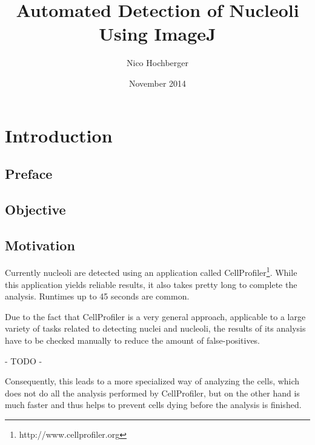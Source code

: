 \documentclass[a4paper, 12pt]{article}
\begin{document}

\nocite{*}

\title{Automated Detection of Nucleoli Using ImageJ}
\author{Nico Hochberger}
\date{November 2014}
\maketitle

\newpage
\tableofcontents

\newpage
\listoffigures

\newpage
\listoftables

\newpage
\section{Introduction}

\subsection{Preface}

\subsection{Objective}

\subsection{Motivation}
Currently nucleoli are detected using an application called
CellProfiler\footnote{http://www.cellprofiler.org}. While this application
yields reliable results, it also takes pretty long to complete the analysis.
Runtimes up to 45 seconds are common.

Due to the fact that CellProfiler is a very general approach, applicable to a
large variety of tasks related to detecting nuclei and nucleoli, the results of
its analysis have to be checked manually to reduce the amount of
false-positives.

- TODO -

Consequently, this leads to a more specialized way of analyzing the cells, which
does not do all the analysis performed by CellProfiler, but on the other hand is
much faster and thus helps to prevent cells dying before the analysis is
finished.
\end{document}
